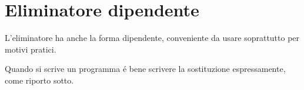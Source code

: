 \section{Eliminatore dipendente}
\label{subsec:eliminatore dipendente-lista}
L'eliminatore ha anche la forma dipendente, conveniente da usare soprattutto per motivi pratici.
\small
\begin{adjustwidth}{-6em}{}
\begin{prooftree}
\end{prooftree}
\end{adjustwidth}
Quando si scrive un programma \'e bene scrivere la sostituzione espressamente, come riporto sotto.
\small
\begin{adjustwidth}{-7em}{}
\begin{prooftree}
\end{prooftree}
\end{adjustwidth}

\normalsize
